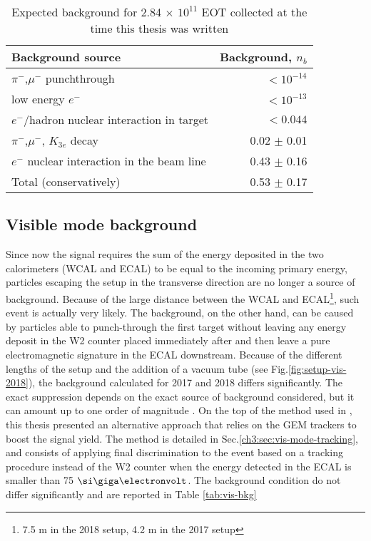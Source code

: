 \begin{table}[bth!]
  \centering
  \caption[Invisible mode background]{Expected background for 2.84 $\times$ $10^{11}$ EOT collected at the time this thesis was written \cite{NA64:2019imj}}
  \begin{tabular}{lr}
    \hline \hline
    Background source & Background, $n_b$ \\
    \hline
    $\pi^-$,$\mu^-$ punchthrough                      & $<10^{-14}$ \\
    low energy $e^-$                                  & $<10^{-13}$ \\
    $e^-$/hadron nuclear interaction in target        & $<0.044$   \\
    $\pi^-$,$\mu^-$, $K_{3e}$ decay                    & 0.02 $\pm$ 0.01 \\
    $e^-$ nuclear interaction in the  beam line       & 0.43 $\pm$ 0.16 \\
    \hline
    Total (conservatively)                            & 0.53 $\pm$ 0.17 \\
    \hline \hline                       
  \end{tabular}
  \label{tab:inv-bkg}
\end{table}


\subsection{Visible mode background}

Since now the signal requires the sum of the energy deposited in the two calorimeters (WCAL and ECAL) to be equal to the incoming primary energy, particles escaping the setup in the transverse direction are no longer a source of background. Because of the large distance between the WCAL and ECAL\footnote{7.5 \si{\meter} in the 2018 setup, 4.2 \si{\meter} in the 2017 setup}, such event is actually very likely. The background, on the other hand, can be caused by particles able to punch-through the first target without leaving any energy deposit in the W2 counter placed immediately after and then leave a pure electromagnetic signature in the ECAL downstream. Because of the different lengths of the setup and the addition of a vacuum tube (see Fig.\ref{fig:setup-vis-2018}), the background calculated for 2017 and 2018 differs significantly. The exact suppression depends on the exact source of background considered, but it can amount up to one order of magnitude \cite{Banerjee:2019hmi}. On the top of the method used in \cite{Banerjee:2019hmi}, this thesis presented an alternative approach that relies on the GEM trackers to boost the signal yield. The method is detailed in Sec.\ref{ch3:sec:vis-mode-tracking}, and consists of applying final discrimination to the event based on a tracking procedure instead of the W2 counter when the energy detected in the ECAL is smaller than 75 $\gev$. The background condition do not differ significantly and are reported in Table \ref{tab:vis-bkg}


